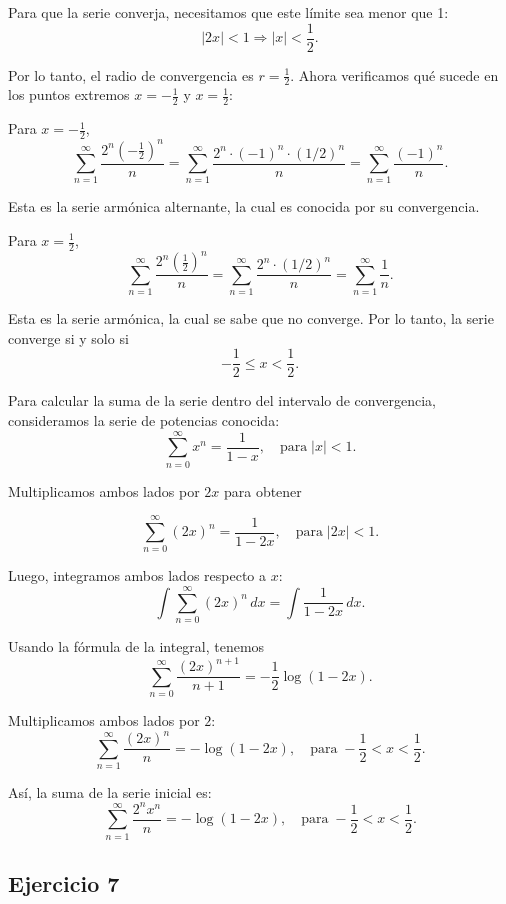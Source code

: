 \documentclass{article}
\begin{document}
    Para que la serie converja, necesitamos que este límite sea menor que 1:
    $$
    |2x| < 1 \Rightarrow |x| < \frac{1}{2}.
    $$

    Por lo tanto, el radio de convergencia es $r = \frac{1}{2}$. Ahora verificamos qué sucede en los puntos extremos $x = -\frac{1}{2}$ y $x = \frac{1}{2}$:

    Para $x = -\frac{1}{2}$,
    $$
    \sum_{n=1}^{\infty} \frac{2^{n} \left(-\frac{1}{2}\right)^{n}}{n} = \sum_{n=1}^{\infty} \frac{2^{n} \cdot (-1)^{n} \cdot (1/2)^{n}}{n} = \sum_{n=1}^{\infty} \frac{(-1)^{n}}{n}.
    $$

    Esta es la serie armónica alternante, la cual es conocida por su convergencia.

    Para $x = \frac{1}{2}$,
    $$
    \sum_{n=1}^{\infty} \frac{2^{n} \left(\frac{1}{2}\right)^{n}}{n} = \sum_{n=1}^{\infty} \frac{2^n \cdot (1/2)^n}{n} = \sum_{n=1}^{\infty} \frac{1}{n}.
    $$

    Esta es la serie armónica, la cual se sabe que no converge. Por lo tanto, la serie converge si y solo si
    $$
    -\frac{1}{2} \leq x < \frac{1}{2}.
    $$

    Para calcular la suma de la serie dentro del intervalo de convergencia, consideramos la serie de potencias conocida:
    $$
    \sum_{n=0}^{\infty} x^{n} = \frac{1}{1-x}, \quad \text{para} \; |x|<1.
    $$

    Multiplicamos ambos lados por $2x$ para obtener

    $$
    \sum_{n=0}^{\infty}(2 x)^{n} = \frac{1}{1-2 x}, \quad \text{para} \; |2x| < 1.
    $$

    Luego, integramos ambos lados respecto a $x$:
    $$
    \int \sum_{n=0}^{\infty} (2x)^n \, dx = \int \frac{1}{1-2x} \, dx.
    $$

    Usando la fórmula de la integral, tenemos
    $$
    \sum_{n=0}^{\infty} \frac{(2x)^{n+1}}{n+1} = -\frac{1}{2} \log (1-2x).
    $$

    Multiplicamos ambos lados por $2$:
    $$
    \sum_{n=1}^{\infty} \frac{(2x)^n}{n} = -\log (1-2x), \quad \text{para} \; -\frac{1}{2} < x < \frac{1}{2}.
    $$

    Así, la suma de la serie inicial es:
    $$
    \sum_{n=1}^{\infty} \frac{2^n x^n}{n} = -\log (1-2x), \quad \text{para} \; -\frac{1}{2} < x < \frac{1}{2}.
    $$

    \subsection*{Ejercicio 7}
\end{document}
